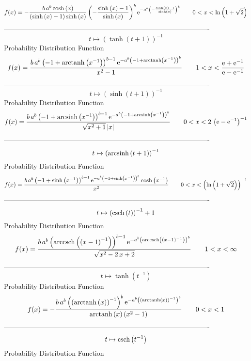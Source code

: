 \documentclass[12pt]{article}
\begin{document}
$$  f(x)=-{\frac {b\,{a}^{b}\cosh \left( x \right) }{ \left( \sinh \left( x
 \right) -1 \right) \sinh \left( x \right) } \left( -{\frac {\sinh
 \left( x \right) -1}{\sinh \left( x \right) }} \right) ^{b}{{\rm e}^{
-{a}^{b} \left( -{\frac {\sinh \left( x \right) -1}{\sinh \left( x
 \right) }} \right) ^{b}}}}
 \qquad0
 < x < \ln  \left( 1+\sqrt {2} \right) 
$$-------------------------------------------------------------------------------------------  \\$$t\mapsto  \left( \tanh \left( t+1 \right)  \right) ^{-1}
$$Probability Distribution Function 
$$  f(x)={\frac {b\,{a}^{b} \left( -1+{\rm arctanh} \left({x}^{-1}\right)
 \right) ^{b-1}{{\rm e}^{-{a}^{b} \left( -1+{\rm arctanh} \left({x}^{-
1}\right) \right) ^{b}}}}{{x}^{2}-1}}
 \qquad1
 < x < {\frac {{\rm e}+{{\rm e}^{-1}}}{{\rm e}-{{\rm e}^{-1}}}}
$$-------------------------------------------------------------------------------------------  \\$$t\mapsto  \left( \sinh \left( t+1 \right)  \right) ^{-1}
$$Probability Distribution Function 
$$  f(x)={\frac {b\,{a}^{b} \left( -1+{\rm arcsinh} \left({x}^{-1}\right)
 \right) ^{b-1}{{\rm e}^{-{a}^{b} \left( -1+{\rm arcsinh} \left({x}^{-
1}\right) \right) ^{b}}}}{\sqrt {{x}^{2}+1} \left| x \right| }}
 \qquad0
 < x < 2\, \left( {\rm e}-{{\rm e}^{-1}} \right) ^{-1}
$$-------------------------------------------------------------------------------------------  \\$$t\mapsto  \left( {\rm arcsinh} \left(t+1\right) \right) ^{-1}
$$Probability Distribution Function 
$$  f(x)={\frac {b\,{a}^{b} \left( -1+\sinh \left( {x}^{-1} \right)  \right) ^{
b-1}{{\rm e}^{-{a}^{b} \left( -1+\sinh \left( {x}^{-1} \right) 
 \right) ^{b}}}\cosh \left( {x}^{-1} \right) }{{x}^{2}}}
 \qquad0
 < x <  \left( \ln  \left( 1+\sqrt {2} \right)  \right) ^{-1}
$$-------------------------------------------------------------------------------------------  \\$$t\mapsto  \left( {\rm csch} \left(t\right) \right) ^{-1}+1
$$Probability Distribution Function 
$$  f(x)={\frac {b\,{a}^{b} \left( {\rm arccsch} \left( \left( x-1 \right) ^{-1
}\right) \right) ^{b-1}{{\rm e}^{-{a}^{b} \left( {\rm arccsch} \left(
 \left( x-1 \right) ^{-1}\right) \right) ^{b}}}}{\sqrt {{x}^{2}-2\,x+2
}}}
 \qquad1
 < x < \infty 
$$-------------------------------------------------------------------------------------------  \\$$t\mapsto \tanh \left( {t}^{-1} \right) 
$$Probability Distribution Function 
$$  f(x)=-{\frac {b\,{a}^{b} \left(  \left( {\rm arctanh} \left(x\right)
 \right) ^{-1} \right) ^{b}{{\rm e}^{-{a}^{b} \left(  \left( 
{\rm arctanh} \left(x\right) \right) ^{-1} \right) ^{b}}}}{
{\rm arctanh} \left(x\right) \left( {x}^{2}-1 \right) }}
 \qquad0
 < x < 1
$$-------------------------------------------------------------------------------------------  \\$$t\mapsto {\rm csch} \left({t}^{-1}\right)
$$Probability Distribution Function 
\end{document}
